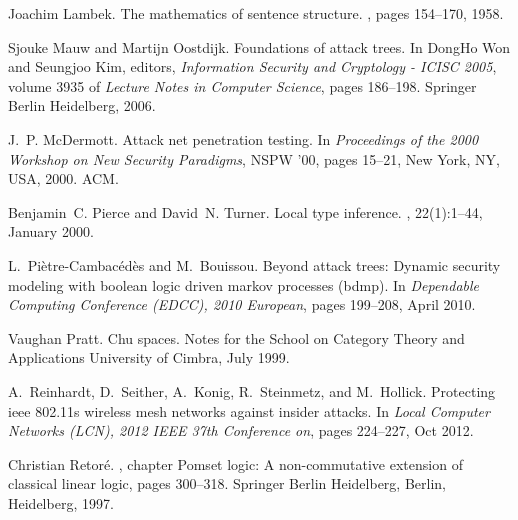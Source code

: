 \documentclass{sigplanconf}
\begin{document}
\begin{thebibliography}{10}
Joachim Lambek.
\newblock The mathematics of sentence structure.
, pages 154--170, 1958.  
  
Sjouke Mauw and Martijn Oostdijk.
\newblock Foundations of attack trees.
\newblock In DongHo Won and Seungjoo Kim, editors, {\em Information Security
  and Cryptology - ICISC 2005}, volume 3935 of {\em Lecture Notes in Computer
  Science}, pages 186--198. Springer Berlin Heidelberg, 2006.

J.~P. McDermott.
\newblock Attack net penetration testing.
\newblock In {\em Proceedings of the 2000 Workshop on New Security Paradigms},
  NSPW '00, pages 15--21, New York, NY, USA, 2000. ACM.

Benjamin~C. Pierce and David~N. Turner.
\newblock Local type inference.
, 22(1):1--44, January 2000.

L.~Pi{\`e}tre-Cambac{\'e}d{\`e}s and M.~Bouissou.
\newblock Beyond attack trees: Dynamic security modeling with boolean logic
  driven markov processes (bdmp).
\newblock In {\em Dependable Computing Conference (EDCC), 2010 European}, pages
  199--208, April 2010.

Vaughan Pratt.
\newblock Chu spaces.
\newblock Notes for the School on Category Theory and Applications University
  of Cimbra, July 1999.

A.~Reinhardt, D.~Seither, A.~Konig, R.~Steinmetz, and M.~Hollick.
\newblock Protecting ieee 802.11s wireless mesh networks against insider
  attacks.
\newblock In {\em Local Computer Networks (LCN), 2012 IEEE 37th Conference on},
  pages 224--227, Oct 2012.

Christian Retor{\'e}.
, chapter Pomset logic: A non-commutative
  extension of classical linear logic, pages 300--318.
\newblock Springer Berlin Heidelberg, Berlin, Heidelberg, 1997.


\end{thebibliography}
\end{document}
